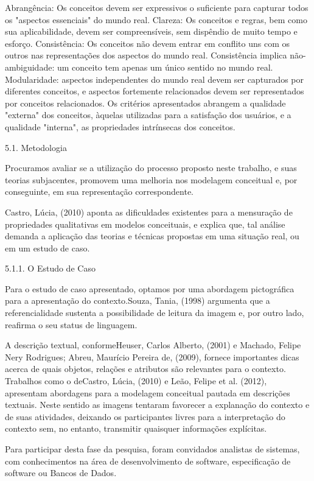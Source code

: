 Abrangência: Os conceitos devem ser expressivos o suficiente para capturar todos os "aspectos essenciais" do mundo real.
Clareza: Os conceitos e regras, bem como sua aplicabilidade, devem ser compreensíveis, sem dispêndio de muito tempo e esforço.
Consistência: Os conceitos não devem entrar em conflito uns com os outros nas representações dos aspectos do mundo real. Consistência implica não-ambiguidade: um conceito tem apenas um único sentido no mundo real.
Modularidade: aspectos independentes do mundo real devem ser capturados por diferentes conceitos, e aspectos fortemente relacionados devem ser representados por conceitos relacionados.
Os critérios apresentados abrangem a qualidade "externa" dos conceitos, àquelas utilizadas para a satisfação dos usuários, e a qualidade "interna", as propriedades intrínsecas dos conceitos.

5.1. Metodologia

Procuramos avaliar se a utilização do processo proposto neste trabalho, e suas teorias subjacentes, promovem uma melhoria nos modelagem conceitual e, por conseguinte, em sua representação correspondente.

Castro, Lúcia, (2010) aponta as dificuldades existentes para a mensuração de propriedades qualitativas em modelos conceituais, e explica que, tal análise demanda a aplicação das teorias e técnicas propostas em uma situação real, ou em um estudo de caso.

5.1.1. O Estudo de Caso

Para o estudo de caso apresentado, optamos por uma abordagem pictográfica para a apresentação do contexto.Souza, Tania, (1998) argumenta que a referencialidade sustenta a possibilidade de leitura da imagem e, por outro lado, reafirma o seu status de linguagem.

A descrição textual, conformeHeuser, Carlos Alberto, (2001) e Machado, Felipe Nery Rodrigues; Abreu, Maurício Pereira de, (2009), fornece importantes dicas acerca de quais objetos, relações e atributos são relevantes para o contexto. Trabalhos como o deCastro, Lúcia, (2010) e Leão, Felipe et al. (2012), apresentam abordagens para a modelagem conceitual pautada em descrições textuais. Neste sentido as imagens tentaram favorecer a explanação do contexto e de suas atividades, deixando os participantes livres para a interpretação do contexto sem, no entanto, transmitir quaisquer informações explícitas.

Para participar desta fase da pesquisa, foram convidados analistas de sistemas, com conhecimentos na área de desenvolvimento de software, especificação de software ou Bancos de Dados.


